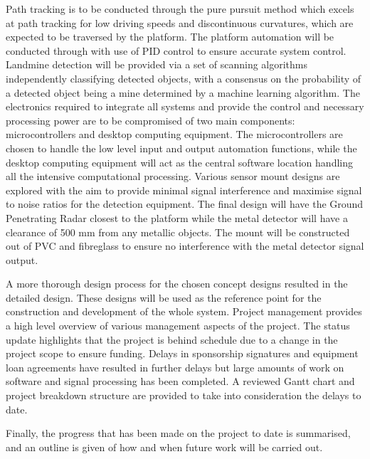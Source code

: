 \documentclass[main.tex]{subfiles}
\begin{document}
Path tracking is to be conducted through the pure pursuit method which excels at path tracking for low driving speeds and discontinuous curvatures, which are expected to be traversed by the platform.
The platform automation will be conducted through with use of PID control to ensure accurate system control. Landmine detection will be provided via a set of scanning algorithms independently classifying detected objects, with a consensus on the probability of a detected object being a mine determined by a machine learning algorithm. 
The electronics required to integrate all systems and provide the control and necessary processing power are to be compromised of two main components: microcontrollers and desktop computing equipment. 
The microcontrollers are chosen to handle the low level input and output automation functions, while the desktop computing equipment will act as the central software location handling all the intensive computational processing. 
Various sensor mount designs are explored with the aim to provide minimal signal interference and maximise signal to noise ratios for the detection equipment. 
The final design will have the Ground Penetrating Radar closest to the platform while the metal detector will have a clearance of 500 mm from any metallic objects.
The mount will be constructed out of PVC and fibreglass to ensure no interference with the metal detector signal output.  

A more thorough design process for the chosen concept designs resulted in the detailed design. These designs will be used as the reference point for the construction and development of the whole system.  
Project management provides a high level overview of various management aspects of the project. The status update highlights that the project is behind schedule due to a change in the project scope to ensure funding. Delays in sponsorship signatures and equipment loan agreements have resulted in further delays but large amounts of work on software and signal processing has been completed. 
A reviewed Gantt chart and project breakdown structure are provided to take into consideration the delays to date. 
 
 Finally, the progress that has been made on the project to date is summarised, and an outline is given of how and when future work will be carried out. 

 

\end{document}
